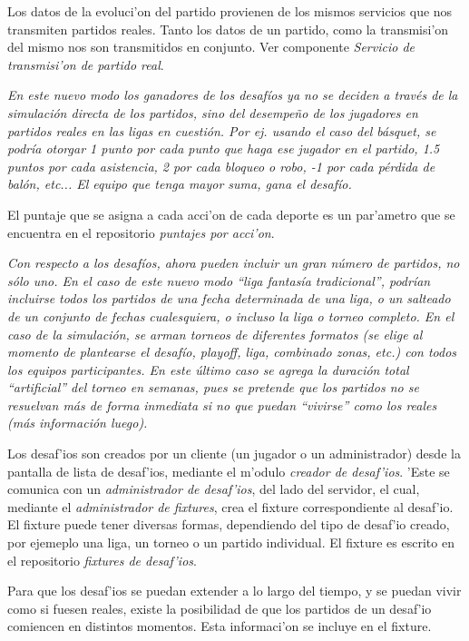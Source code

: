 Los datos de la evoluci'on del partido provienen de los mismos servicios que nos transmiten partidos reales. Tanto los datos de un partido, como la transmisi'on del mismo nos son transmitidos en conjunto. Ver componente \textit{Servicio de transmisi'on de partido real}.

\textit{En este nuevo modo los ganadores de los desafíos ya no se deciden a través de la simulación directa de los partidos, sino del desempeño de los jugadores en partidos reales en las ligas en cuestión. Por ej. usando el caso del básquet, se podría otorgar 1 punto por cada punto que haga ese jugador en el partido, 1.5 puntos por cada asistencia, 2 por cada bloqueo o robo, -1 por cada pérdida de balón, etc... El equipo que tenga mayor suma, gana el desafío.}

El puntaje que se asigna a cada acci'on de cada deporte es un par'ametro que se encuentra en el repositorio \textit{puntajes por acci'on}.

\textit{Con respecto a los desafíos, ahora pueden incluir un gran número de partidos, no sólo uno. En el caso de este nuevo modo ``liga fantasía tradicional'', podrían incluirse todos los partidos de una fecha determinada de una liga, o un salteado de un conjunto de fechas cualesquiera, o incluso la liga o torneo completo.
En el caso de la simulación, se arman torneos de diferentes formatos (se elige al momento de plantearse el desafío, playoff, liga, combinado zonas, etc.) con todos los equipos participantes. En este último caso se agrega la duración total “artificial” del torneo en semanas, pues se pretende que los partidos no se resuelvan más de forma inmediata si no que puedan “vivirse” como los
reales (más información luego).
}

Los desaf'ios son creados por un cliente (un jugador o un administrador) desde la pantalla de lista de desaf'ios, mediante el m'odulo \textit{creador de desaf'ios}. 'Este se comunica con un \textit{administrador de desaf'ios}, del lado del servidor, el cual, mediante el \textit{administrador de fixtures}, crea el fixture correspondiente al desaf'io. El fixture puede tener diversas formas, dependiendo del tipo de desaf'io creado, por ejemeplo una liga, un torneo o un partido individual. El fixture es escrito en el repositorio \textit{fixtures de desaf'ios}.

Para que los desaf'ios se puedan extender a lo largo del tiempo, y se puedan vivir como si fuesen reales, existe la posibilidad de que los partidos de un desaf'io comiencen en distintos momentos. Esta informaci'on se incluye en el fixture.

